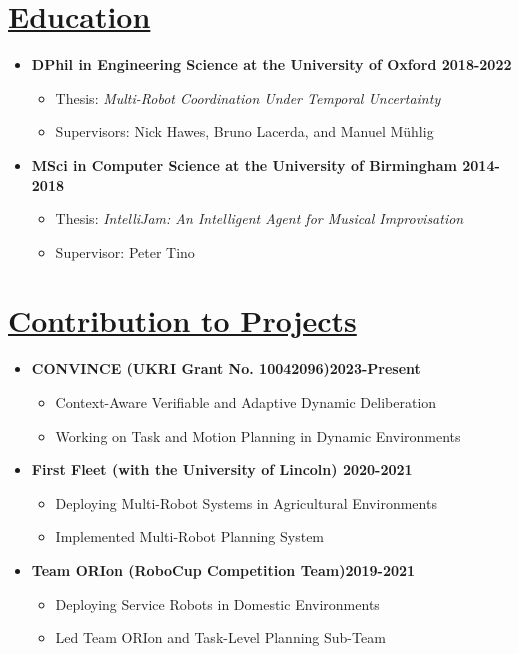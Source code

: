 \documentclass[11pt]{article}
\begin{document}
\section*{\uline{Education\hfill}}
\vspace{-5pt}
\begin {itemize}
\item \textbf{DPhil in Engineering Science at the University of Oxford \hfill 2018-2022} 
\begin{itemize}
    \item Thesis: \emph{Multi-Robot Coordination Under Temporal Uncertainty}
    \item Supervisors: Nick Hawes, Bruno Lacerda, and Manuel M{\"u}hlig
\end{itemize}
			
\item \textbf{MSci in Computer Science at the University of Birmingham \hfill 2014-2018}
\begin{itemize}
\item Thesis: \emph{IntelliJam: An Intelligent Agent for Musical Improvisation}
\item Supervisor: Peter Tino
\end{itemize}
\end{itemize}

\vspace{-10pt}
\section*{\uline{Contribution to Projects\hfill}}
\vspace{-5pt}
\begin{itemize}
\item \textbf{CONVINCE (UKRI Grant No. 10042096)\hfill 2023-Present}
\begin{itemize}
\item Context-Aware Verifiable and Adaptive Dynamic Deliberation 
\item Working on Task and Motion Planning in Dynamic Environments 
\end{itemize}
\item \textbf{First Fleet (with the University of Lincoln) \hfill 2020-2021}
\begin{itemize}
\item Deploying Multi-Robot Systems in Agricultural Environments
\item Implemented Multi-Robot Planning System
\end{itemize}
\item \textbf{Team ORIon (RoboCup Competition Team)\hfill 2019-2021}
\begin{itemize}
\item Deploying Service Robots in Domestic Environments
\item Led Team ORIon and Task-Level Planning Sub-Team
\end{itemize}
\end{itemize}
\end{document}
